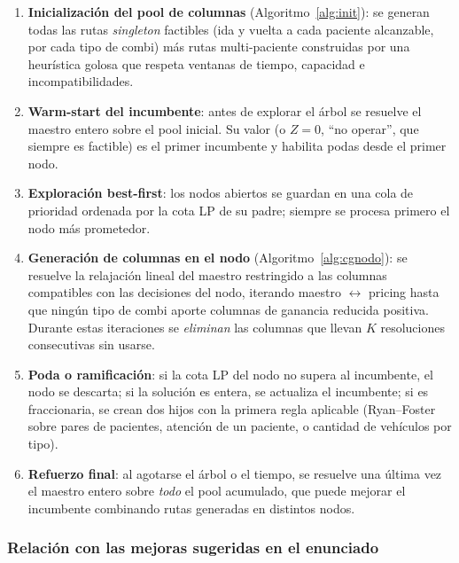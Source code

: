 \documentclass[12pt]{article}
\numberwithin{algorithm}{section}
\begin{document}
\begin{enumerate}
    \item \textbf{Inicialización del pool de columnas} (Algoritmo~\ref{alg:init}): se generan todas las rutas \emph{singleton} factibles (ida y vuelta a cada paciente alcanzable, por cada tipo de combi) más rutas multi-paciente construidas por una heurística golosa que respeta ventanas de tiempo, capacidad e incompatibilidades.
    \item \textbf{Warm-start del incumbente}: antes de explorar el árbol se resuelve el maestro entero sobre el pool inicial. Su valor (o $Z = 0$, ``no operar'', que siempre es factible) es el primer incumbente y habilita podas desde el primer nodo.
    \item \textbf{Exploración best-first}: los nodos abiertos se guardan en una cola de prioridad ordenada por la cota LP de su padre; siempre se procesa primero el nodo más prometedor.
    \item \textbf{Generación de columnas en el nodo} (Algoritmo~\ref{alg:cgnodo}): se resuelve la relajación lineal del maestro restringido a las columnas compatibles con las decisiones del nodo, iterando maestro $\leftrightarrow$ pricing hasta que ningún tipo de combi aporte columnas de ganancia reducida positiva. Durante estas iteraciones se \emph{eliminan} las columnas que llevan $K$ resoluciones consecutivas sin usarse.
    \item \textbf{Poda o ramificación}: si la cota LP del nodo no supera al incumbente, el nodo se descarta; si la solución es entera, se actualiza el incumbente; si es fraccionaria, se crean dos hijos con la primera regla aplicable (Ryan--Foster sobre pares de pacientes, atención de un paciente, o cantidad de vehículos por tipo).
    \item \textbf{Refuerzo final}: al agotarse el árbol o el tiempo, se resuelve una última vez el maestro entero sobre \emph{todo} el pool acumulado, que puede mejorar el incumbente combinando rutas generadas en distintos nodos.
\end{enumerate}

\subsubsection*{Relación con las mejoras sugeridas en el enunciado}
\end{document}

